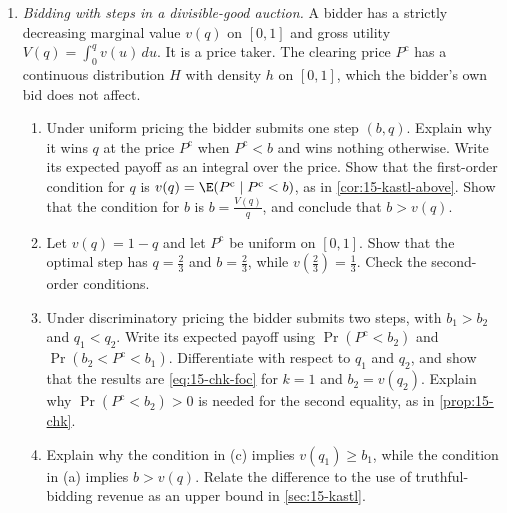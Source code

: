 \begin{enumerate}[label=\arabic*., leftmargin=*, itemsep=6pt]
\item\label{exc:15-divisible} \textit{Bidding with steps in a divisible-good auction.} A bidder has a strictly
decreasing marginal value $v(q)$ on $[0,1]$ and gross utility $V(q)=\int_0^q v(u)\,du$. It is a price taker.
The clearing price $P^{\mathrm c}$ has a continuous distribution $H$ with density $h$ on $[0,1]$, which the
bidder's own bid does not affect.
\begin{enumerate}[label=(\alph*)]
  \item Under uniform pricing the bidder submits one step $(b,q)$. Explain why it wins $q$ at the price
  $P^{\mathrm c}$ when $P^{\mathrm c}<b$ and wins nothing otherwise. Write its expected payoff as an integral
  over the price. Show that the first-order condition for $q$ is $v(q)=\E(P^{\mathrm c}\mid P^{\mathrm c}<b)$,
  as in \cref{cor:15-kastl-above}. Show that the condition for $b$ is $b=\frac{V(q)}{q}$, and conclude that
  $b>v(q)$.
  \item Let $v(q)=1-q$ and let $P^{\mathrm c}$ be uniform on $[0,1]$. Show that the optimal step has
  $q=\frac23$ and $b=\frac23$, while $v(\frac23)=\frac13$. Check the second-order conditions.
  \item Under discriminatory pricing the bidder submits two steps, with $b_1>b_2$ and $q_1<q_2$. Write its
  expected payoff using $\Pr(P^{\mathrm c}<b_2)$ and $\Pr(b_2<P^{\mathrm c}<b_1)$. Differentiate with respect
  to $q_1$ and $q_2$, and show that the results are \eqref{eq:15-chk-foc} for $k=1$ and $b_2=v(q_2)$.
  Explain why $\Pr(P^{\mathrm c}<b_2)>0$ is needed for the second equality, as in \cref{prop:15-chk}.
  \item Explain why the condition in (c) implies $v(q_1)\ge b_1$, while the condition in (a) implies $b>v(q)$.
  Relate the difference to the use of truthful-bidding revenue as an upper bound in \cref{sec:15-kastl}.
\end{enumerate}

\end{enumerate}
